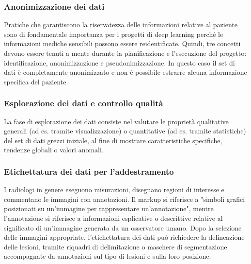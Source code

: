 \documentclass[12pt,a4paper]{report}
\begin{document}
\subsubsection{Anonimizzazione dei dati}
Pratiche che garantiscono la riservatezza delle informazioni relative al paziente sono di fondamentale importanza per i progetti di deep learning perché le informazioni mediche sensibili possono essere reidentificate. Quindi, tre concetti devono essere tenuti a mente durante la pianificazione e l'esecuzione del progetto: identificazione, anonimizzazione e pseudonimizzazione.
In questo caso il set di dati è completamente anonimizzato e non è possibile estrarre alcuna informazione specifica del paziente. 

\subsubsection{Esplorazione dei dati e controllo qualità}
La fase di esplorazione dei dati consiste nel valutare le proprietà qualitative generali (ad es. tramite visualizzazione) o quantitative (ad es. tramite statistiche) del set di dati grezzi iniziale, al fine di mostrare caratteristiche specifiche, tendenze globali o valori anomali.

\subsubsection{Etichettatura dei dati per l'addestramento}
I radiologi in genere eseguono misurazioni, disegnano regioni di interesse e commentano le immagini con annotazioni. Il markup si riferisce a "simboli grafici posizionati su un'immagine per rappresentare un'annotazione", mentre l'annotazione si riferisce a informazioni esplicative o descrittive relative al significato di un'immagine generata da un osservatore umano.
Dopo la selezione delle immagini appropriate, l'etichettatura dei dati può richiedere la delineazione delle lesioni, tramite riquadri di delimitazione o maschere di segmentazione accompagnate da annotazioni sul tipo di lesioni e sulla loro posizione.
\end{document}
